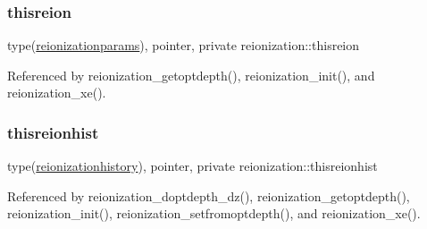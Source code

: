 \subsubsection{\texorpdfstring{thisreion}{thisreion}}
{\footnotesize\ttfamily type(\mbox{\hyperlink{structreionization_1_1reionizationparams}{reionizationparams}}), pointer, private reionization\+::thisreion\hspace{0.3cm}{\ttfamily [private]}}



Referenced by reionization\+\_\+getoptdepth(), reionization\+\_\+init(), and reionization\+\_\+xe().

\mbox{\label{namespacereionization_afc2b645c62db796865419a767ad68a98}} 
\subsubsection{\texorpdfstring{thisreionhist}{thisreionhist}}
{\footnotesize\ttfamily type(\mbox{\hyperlink{structreionization_1_1reionizationhistory}{reionizationhistory}}), pointer, private reionization\+::thisreionhist\hspace{0.3cm}{\ttfamily [private]}}



Referenced by reionization\+\_\+doptdepth\+\_\+dz(), reionization\+\_\+getoptdepth(), reionization\+\_\+init(), reionization\+\_\+setfromoptdepth(), and reionization\+\_\+xe().

